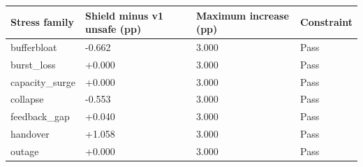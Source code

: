 \begin{tabular}{llll}
\toprule
Stress family & Shield minus v1 unsafe (pp) & Maximum increase (pp) & Constraint \\
\midrule
bufferbloat & -0.662 & 3.000 & Pass \\
burst\_loss & +0.000 & 3.000 & Pass \\
capacity\_surge & +0.000 & 3.000 & Pass \\
collapse & -0.553 & 3.000 & Pass \\
feedback\_gap & +0.040 & 3.000 & Pass \\
handover & +1.058 & 3.000 & Pass \\
outage & +0.000 & 3.000 & Pass \\
\bottomrule
\end{tabular}
